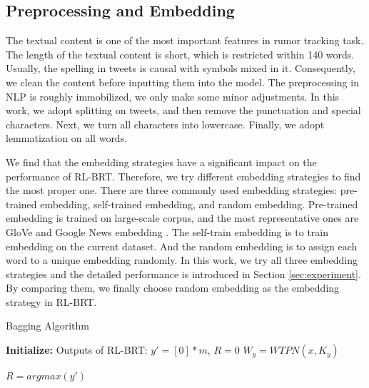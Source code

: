 \subsection{Preprocessing and Embedding}
\label{sec:process_embedding}
The textual content is one of the most important features in rumor tracking task. The length of the textual content is short, which is restricted within 140 words. Usually, the spelling in tweets is causal with symbols mixed in it. Consequently, we clean the content before inputting them into the model. The preprocessing in NLP is roughly immobilized, we only make some minor adjustments. In this work, we adopt splitting on tweets, and then remove the punctuation and special characters. Next, we turn all characters into lowercase. Finally, we adopt lemmatization on all words.

We find that the embedding strategies have a significant impact on the performance of RL-BRT. Therefore, we try different embedding strategies to find the most proper one. There are three commonly used embedding strategies: pre-trained embedding, self-trained embedding, and random embedding. Pre-trained embedding is trained on large-scale corpus, and the most representative ones are GloVe \cite{DBLP:conf/emnlp/PenningtonSM14} and Google News embedding \cite{googlenews}. The self-train embedding is to train embedding on the current dataset. And the random embedding is to assign each word to a unique embedding randomly. In this work, we try all three embedding strategies and the detailed performance is introduced in Section \ref{sec:experiment}. By comparing them, we finally choose random embedding as the embedding strategy in RL-BRT.

\begin{algorithm}[tbp]
	\caption{Bagging Algorithm}
	\label{algorithm:RL-BRT}
	\LinesNumbered %
	\textbf{Initialize:} Outputs of RL-BRT: $y' = [0]*m$, $R = 0$ \;
	$W_y =  WTPN(x, K_y)$ \;
	
	$R = argmax(y')$
\end{algorithm}


